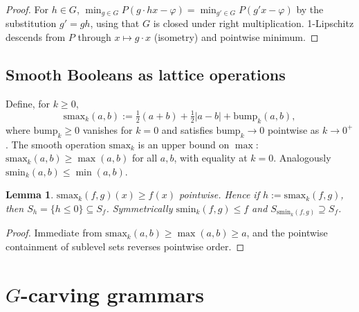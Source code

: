 \documentclass[11pt]{article}
\newtheorem{lemma}[theorem]{Lemma}
\theoremstyle{definition}
\begin{document}
\begin{proof}
For $h \in G$,
$\min_{g\in G} P(g\cdot hx - \varphi) = \min_{g' \in G} P(g' x - \varphi)$
by the substitution $g' = gh$, using that $G$ is closed under right
multiplication. 1-Lipschitz descends from $P$ through
$x \mapsto g\cdot x$ (isometry) and pointwise minimum.
\end{proof}

\subsection{Smooth Booleans as lattice operations}

Define, for $k \ge 0$,
\[
  \mathrm{smax}_k(a,b) := \tfrac12(a+b) + \tfrac12|a - b| + \mathrm{bump}_k(a,b),
\]
where $\mathrm{bump}_k \ge 0$ vanishes for $k=0$ and satisfies
$\mathrm{bump}_k \to 0$ pointwise as $k \to 0^+$. The smooth operation
$\mathrm{smax}_k$ is an upper bound on $\max$: $\mathrm{smax}_k(a,b) \ge
\max(a,b)$ for all $a,b$, with equality at $k=0$. Analogously
$\mathrm{smin}_k(a,b) \le \min(a,b)$.

\begin{lemma}
\label{lem:smax-monotone}
$\mathrm{smax}_k(f, g)(x) \ge f(x)$ pointwise. Hence if
$h := \mathrm{smax}_k(f, g)$, then $S_h = \{h \le 0\} \subseteq S_f$.
Symmetrically $\mathrm{smin}_k(f, g) \le f$ and
$S_{\mathrm{smin}_k(f,g)} \supseteq S_f$.
\end{lemma}

\begin{proof}
Immediate from $\mathrm{smax}_k(a,b) \ge \max(a,b) \ge a$, and the
pointwise containment of sublevel sets reverses pointwise order.
\end{proof}

\section{$G$-carving grammars}
\label{sec:grammars}
\end{document}
